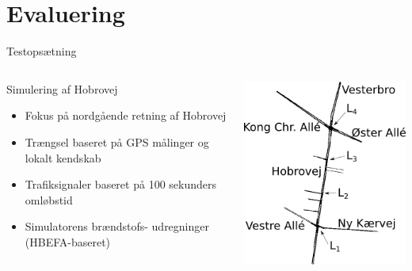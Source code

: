 \section{Evaluering}
\begin{frame}{Testopsætning}
\begin{columns}
\begin{column}{0.6\textwidth}
Simulering af Hobrovej
\begin{itemize}
\item Fokus på nordgående retning af Hobrovej
\item Trængsel baseret på GPS målinger og lokalt kendskab
\item Trafiksignaler baseret på 100 sekunders omløbstid
\item Simulatorens brændstofs- udregninger (HBEFA-baseret)
\end{itemize}
\end{column}

\begin{column}{0.5\textwidth}
\includegraphics[width=1\textwidth]{../images/HobrovejNy.png}
\end{column}
\end{columns}
\end{frame}

